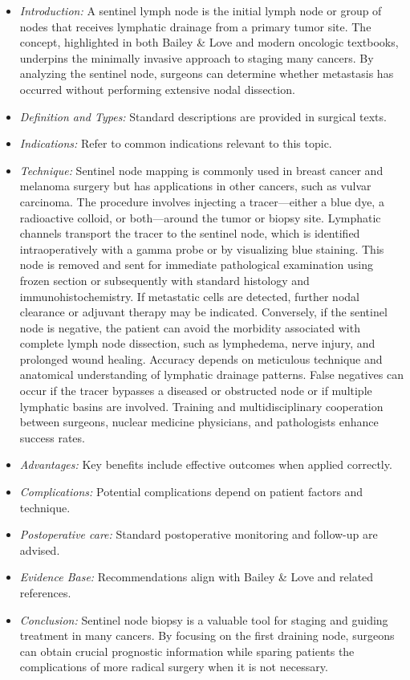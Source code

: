 \documentclass{article}
\begin{document}
\begin{itemize}

\item \emph{Introduction:} A sentinel lymph node is the initial lymph node or group of nodes that receives lymphatic drainage from a primary tumor site. The concept, highlighted in both Bailey \& Love and modern oncologic textbooks, underpins the minimally invasive approach to staging many cancers. By analyzing the sentinel node, surgeons can determine whether metastasis has occurred without performing extensive nodal dissection.
\item \emph{Definition and Types:} Standard descriptions are provided in surgical texts.
\item \emph{Indications:} Refer to common indications relevant to this topic.

\item \emph{Technique:} Sentinel node mapping is commonly used in breast cancer and melanoma surgery but has applications in other cancers, such as vulvar carcinoma. The procedure involves injecting a tracer—either a blue dye, a radioactive colloid, or both—around the tumor or biopsy site. Lymphatic channels transport the tracer to the sentinel node, which is identified intraoperatively with a gamma probe or by visualizing blue staining. This node is removed and sent for immediate pathological examination using frozen section or subsequently with standard histology and immunohistochemistry. If metastatic cells are detected, further nodal clearance or adjuvant therapy may be indicated. Conversely, if the sentinel node is negative, the patient can avoid the morbidity associated with complete lymph node dissection, such as lymphedema, nerve injury, and prolonged wound healing. Accuracy depends on meticulous technique and anatomical understanding of lymphatic drainage patterns. False negatives can occur if the tracer bypasses a diseased or obstructed node or if multiple lymphatic basins are involved. Training and multidisciplinary cooperation between surgeons, nuclear medicine physicians, and pathologists enhance success rates.
\item \emph{Advantages:} Key benefits include effective outcomes when applied correctly.
\item \emph{Complications:} Potential complications depend on patient factors and technique.
\item \emph{Postoperative care:} Standard postoperative monitoring and follow-up are advised.
\item \emph{Evidence Base:} Recommendations align with Bailey \& Love and related references.

\item \emph{Conclusion:} Sentinel node biopsy is a valuable tool for staging and guiding treatment in many cancers. By focusing on the first draining node, surgeons can obtain crucial prognostic information while sparing patients the complications of more radical surgery when it is not necessary.


\end{itemize}
\end{document}
